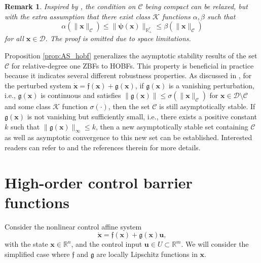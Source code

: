 \documentclass[letterpaper, 10 pt, journal, twoside]{IEEEtran}
\theoremstyle{plain}
\newtheorem{remark}{Remark}
\newcommand{\myvar}[1]{\bm{#1}}
\newcommand{\myvarfrak}[1]{\bm{\mathfrak{#1}}}
\newcommand{\myvardot}[1]{\dot{\myvar{#1}}}
\newcommand{\myset}[1]{\mathscr{#1}}
\begin{document}
    


\begin{remark}
Inspired by \cite{el2007passivity}, the condition on $\myset{C}$ being compact can be relaxed, but with the extra assumption that there exist class $\mathcal{K}$ functions $\alpha, \beta$ such that
\begin{equation}
    \alpha(\| \myvar{x} \|_{\myset{C}}) \leq \| \myvar{\psi}(\myvar{x}) \|_{\mathbb{R}_{+}^{r}} \leq  \beta(\| \myvar{x} \|_{\myset{C}})
\end{equation}
for all $\myvar{x} \in \myset{D}$. The proof is omitted due to space limitations. 
\end{remark}

	 Proposition \ref{prop:AS_hobf} generalizes  the asymptotic stability {results} of the set $\myset{C}$ {for relative-degree one ZBFs} \cite[Proposition~4]{Xu2015a}  to HOBFs. This property is beneficial in practice because it indicates several different robustness properties.  As discussed in  \cite{Xu2015a}, for the perturbed system $\dot{\myvar{x}} = \myvarfrak{f}(\myvar{x}) + \myvarfrak{g}(\myvar{x})$, if  $\myvarfrak{g}(\myvar{x})$ is a vanishing perturbation, i.e., $\myvarfrak{g}(\myvar{x})$ is continuous and  satisfies $\| \myvarfrak{g}(\myvar{x}) \| \le \sigma(\| \myvar{x}\|_{\myset{C}})$ for $\myvar{x} \in \myset{D}\setminus \myset{C}$ and some class $\mathcal{K}$ function $\sigma(\cdot)$, then the set $\myset{C}$ is still asymptotically stable. If $\myvarfrak{g}(\myvar{x})$ is not vanishing but sufficiently small, i.e., there exists a positive constant $k$ such that  $\| \myvarfrak{g}(\myvar{x}) \|_{\infty} \le k $, then  a new asymptotically stable set containing $\myset{C}$ as well as asymptotic convergence to this new set can be established. Interested readers can refer to \cite{Xu2015a} and the references therein for more details.
	

\section{High-order control barrier functions} \label{sec:hocbf}
Consider the nonlinear control affine system
\begin{equation} \label{eq:nonlinear_dyn}
    \myvardot{x} = \myvarfrak{f}(\myvar{x}) + \myvarfrak{g}(\myvar{x}) \myvar{u},
\end{equation}
{with} the state $\myvar{x} \in \mathbb{R}^n$, and the control input $ \myvar{u} \in U \subset \mathbb{R}^m$.   We will consider the simplified case where $\myvarfrak{f}$ and $\myvarfrak{g}$ are locally Lipschitz functions in $\myvar{x}$.
\end{document}
